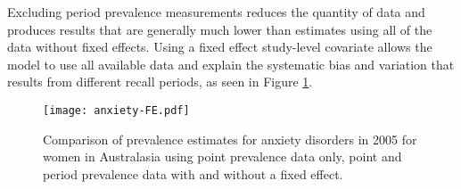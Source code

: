 Excluding period prevalence measurements reduces the quantity of data
and produces results that are generally much lower than estimates
using all of the data without fixed effects.  Using a fixed effect
study-level covariate allows the model to use all available data and
explain the systematic bias and variation that results from different
recall periods, as seen in Figure \ref{fig:app-anxiety FE}.

    \begin{figure}[h]
        \begin{center}
            \texttt{[image: anxiety-FE.pdf]}
            \caption{Comparison of prevalence estimates for anxiety
              disorders in 2005 for women in Australasia using point
              prevalence data only, point and period prevalence data
              with and without a fixed effect.}
            \label{fig:app-anxiety FE}
        \end{center}
    \end{figure}

